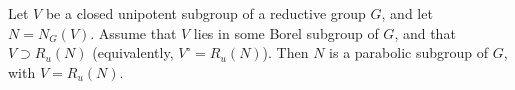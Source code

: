 Let $V$ be a closed unipotent subgroup of a reductive group $G$, and let $N = N_G(V)$. Assume that $V$ lies in some Borel subgroup of $G$, and that $V \supset R_u(N)$ (equivalently, $V^\circ = R_u(N)$). Then $N$ is a parabolic subgroup of $G$, with $V = R_u(N)$.
